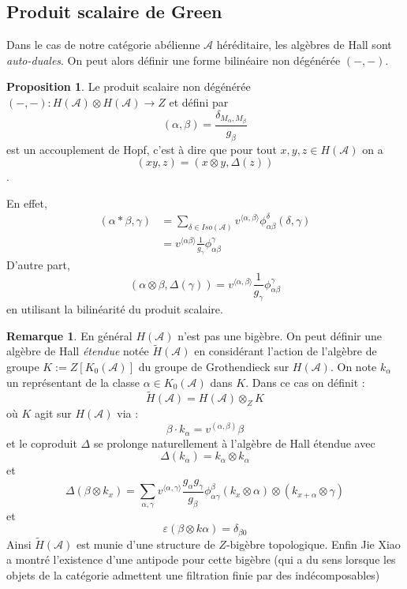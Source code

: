 \documentclass[12pt]{article}
\theoremstyle{definition}
\newtheorem{Prop}{Proposition}[section]
\newtheorem{rem}{Remarque}[section]
\begin{document}
\subsection{Produit scalaire de Green}
Dans le cas de notre catégorie abélienne $\mathcal{A}$  héréditaire,  les algèbres de Hall sont \textit{auto-duales}. On peut alors définir une forme bilinéaire non dégénérée $\left(-,-\right)$.
\begin{Prop}\cite{Green0} Le produit scalaire non dégénérée $ \left(-,-\right): H(\mathcal{A})\otimes H(\mathcal{A})\to Z$ et défini par $$(\alpha,\beta)=\frac{\delta_{M_\alpha,M_\beta}}{g_\beta}$$ est un accouplement de Hopf, c'est à dire que pour tout $x,y,z\in H(\mathcal{A})$ on a $$(xy,z)=(x\otimes y,\Delta(z))$$. \end{Prop}
En effet, \begin{align*}
(\alpha\ast\beta,\gamma)&=\underset{\delta\in Iso(\mathcal{A})}{\sum}v^{\langle\alpha,\beta\rangle}\phi^{\delta}_{\alpha\beta}(\delta,\gamma)\\
&=v^{\langle\alpha\beta\rangle}\frac{1}{g_{\gamma}}\phi^{\gamma}_{\alpha\beta} 
\end{align*}
D'autre part, $$\left(\alpha\otimes\beta,\Delta(\gamma)\right)=v^{\langle\alpha,\beta\rangle}\frac{1}{g_{\gamma}}\phi^{\gamma}_{\alpha\beta} $$ en utilisant la bilinéarité du produit scalaire.
\begin{rem}En général $H(\mathcal{A})$ n'est pas une bigèbre. On peut définir une algèbre de Hall \textit{étendue} notée $\widetilde{H}(\mathcal{A})$ en considérant l'action de l'algèbre de groupe $K:=Z[K_0(\mathcal{A})]$ du groupe de Grothendieck sur $H(\mathcal{A})$. On note $k_{\alpha}$ un représentant de la classe $\alpha\in K_0(\mathcal{A})$ dans $K$. Dans ce cas on définit : $$\widetilde{H}(\mathcal{A})=H(\mathcal{A})\otimes_Z K$$ où $K$ agit sur $H(\mathcal{A})$ via : $$\beta\cdot k_\alpha=v^{(\alpha,\beta)}\beta$$ et le coproduit $\Delta$ se prolonge naturellement à l'algèbre de Hall étendue avec $$\Delta(k_\alpha)=k_\alpha\otimes k_\alpha$$ et $$\Delta(\beta\otimes k_x)=\underset{\alpha,\gamma}{\sum}v^{\langle\alpha,\gamma\rangle}\frac{g_\alpha g_\gamma}{g_\beta}\phi^{\beta}_{\alpha\gamma}(k_x\otimes\alpha)\otimes(k_{x+\alpha}\otimes\gamma)$$ et $$\varepsilon(\beta\otimes k\alpha)=\delta_{\beta 0}$$ Ainsi $\widetilde{H}(\mathcal{A})$ est munie d'une structure de $Z$-bigèbre topologique. Enfin Jie Xiao a montré l'existence d'une antipode pour cette bigèbre (qui a du sens lorsque les objets de la catégorie admettent une filtration finie par des indécomposables) \cite{xia} \end{rem} 
\pagebreak
\end{document}
